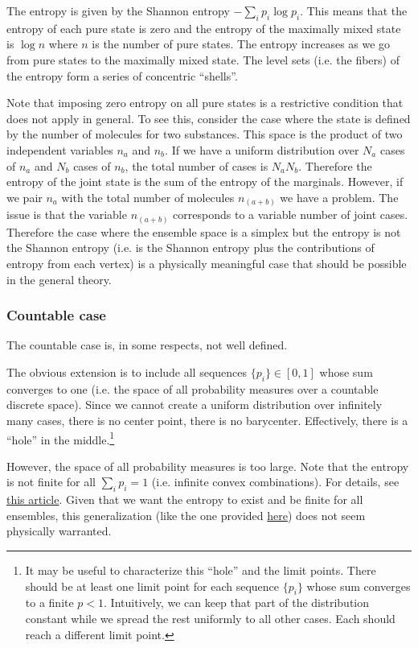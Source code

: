 The entropy is given by the Shannon entropy $-\sum_i p_i \log p_i$. This means that the entropy of each pure state is zero and the entropy of the maximally mixed state is $\log n$ where $n$ is the number of pure states. The entropy increases as we go from pure states to the maximally mixed state. The level sets (i.e. the fibers) of the entropy form a series of concentric ``shells''.

Note that imposing zero entropy on all pure states is a restrictive condition that does not apply in general. To see this, consider the case where the state is defined by the number of molecules for two substances. This space is the product of two independent variables $n_a$ and $n_b$. If we have a uniform distribution over $N_a$ cases of $n_a$ and $N_b$ cases of $n_b$, the total number of cases is $N_a N_b$. Therefore the entropy of the joint state is the sum of the entropy of the marginals. However, if we pair $n_a$ with the total number of molecules $n_{(a+b)}$ we have a problem. The issue is that the variable $n_{(a+b)}$ corresponds to a variable number of joint cases. Therefore the case where the ensemble space is a simplex but the entropy is not the Shannon entropy (i.e. is the Shannon entropy plus the contributions of entropy from each vertex) is a physically meaningful case that should be possible in the general theory.

\subsubsection{Countable case}

The countable case is, in some respects, not well defined.

The obvious extension is to include all sequences $\{p_i\} \in [0,1]$ whose sum converges to one (i.e. the space of all probability measures over a countable discrete space). Since we cannot create a uniform distribution over infinitely many cases, there is no center point, there is no barycenter. Effectively, there is a ``hole'' in the middle.\footnote{It may be useful to characterize this ``hole'' and the limit points. There should be at least one limit point for each sequence $\{p_i\}$ whose sum converges to a finite $p < 1$. Intuitively, we can keep that part of the distribution constant while we spread the rest uniformly to all other cases. Each should reach a different limit point.}

However, the space of all probability measures is too large. Note that the entropy is not finite for all $\sum_i p_i =1$ (i.e. infinite convex combinations). For details, see \href{https://arxiv.org/pdf/1212.5630.pdf}{this article}. Given that we want the entropy to exist and be finite for all ensembles, this generalization (like the one provided \href{https://ncatlab.org/nlab/show/superconvex+space}{here}) does not seem physically warranted.

